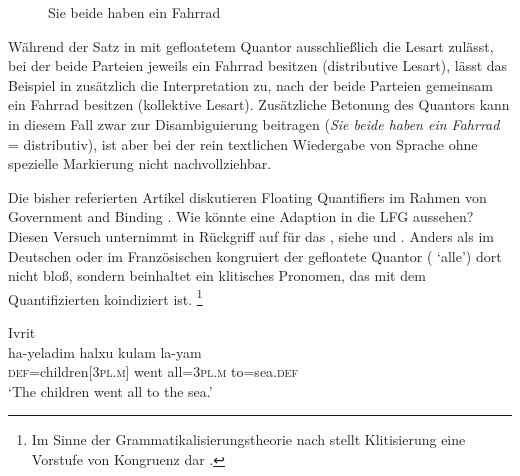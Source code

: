 \begin{figure}
\caption{Sie beide haben ein Fahrrad}
\label{fig:siebeidefhrd_2}
\end{figure}

Während der Satz in  mit gefloatetem Quantor
ausschließlich die Lesart zulässt, bei der beide Parteien jeweils ein Fahrrad
besitzen (distributive Lesart), lässt das Beispiel in
 zusätzlich die Interpretation zu, nach der beide
Parteien gemeinsam ein Fahrrad besitzen (kollektive Lesart). Zusätzliche
Betonung des Quantors kann in diesem Fall zwar zur Disambiguierung beitragen
(\emph{Sie \emph{beide} haben ein Fahrrad} = distributiv), ist aber bei der
rein textlichen Wiedergabe von Sprache ohne spezielle Markierung nicht
nachvollziehbar.

\label{phsec:hebrqf}
Die bisher referierten Artikel diskutieren Floating Quantifiers im Rahmen von
Government and Binding \autocite{chomsky1981}. Wie könnte eine Adaption in die
LFG aussehen? Diesen Versuch unternimmt \citet{spector2009} in Rückgriff auf
\citet{shlonsky1991} für das , siehe  und
. Anders als im Deutschen oder im
Französischen kongruiert der gefloatete Quantor (
`alle') dort nicht bloß, sondern beinhaltet ein klitisches Pronomen, das mit
dem Quantifizierten koindiziert ist.%
%
	\footnote{Im Sinne der Grammatikalisierungs\-theorie nach
		\citet{lehmann2015} stellt Klitisierung eine Vorstufe von Kongruenz dar
		\autocite[vgl.][44]{lehmann2015}.%
	}

\begin{exe}
\ex \label{ex:hebrqf}
	\langinfo%
		{Ivrit}
		{}
		{\cite[nach][522, 537]{spector2009}}\\
	\gll ha-yeladim halxu kulam la-yam \\
		\textsc{def}=children[\textsc{3pl.m}] went all=\textsc{3pl.m}
			to=sea.\textsc{def} \\
	\trans `The children went all to the sea.'
\end{exe}

